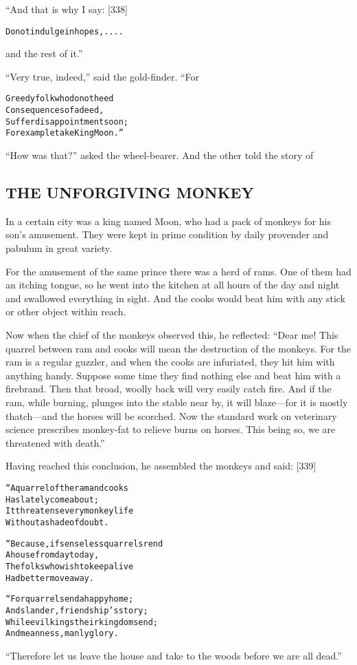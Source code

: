 \documentclass{article}
\renewenvironment{verbatim}{\begin{alltt}\normalfont\begin{centering}}{\end{centering}\end{alltt}}
\begin{document}
“And that is why I say: [338]

\begin{verbatim}
Do not indulge in hopes, ....
\end{verbatim}
and the rest of it.”

``Very true, indeed,'' said the gold-finder. “For

\begin{verbatim}
Greedy folk who do not heed
Consequences of a deed,
Suffer disappointment soon;
For example take King Moon.”
\end{verbatim}
``How was that?'' asked the wheel-bearer. And the other told the
story of

\subsection{THE UNFORGIVING MONKEY}

In a certain city was a king named Moon, who had a pack of monkeys
for his son's amusement. They were kept in prime condition by daily
provender and pabulum in great variety.

For the amusement of the same prince there was a herd of rams. One
of them had an itching tongue, so he went into the kitchen at all
hours of the day and night and swallowed everything in sight. And
the cooks would beat him with any stick or other object within
reach.

Now when the chief of the monkeys observed this, he reflected:
``Dear me! This quarrel between ram and cooks will mean the destruction of the monkeys. For the ram is a regular guzzler, and when the cooks are infuriated, they hit him with anything handy. Suppose some time they find nothing else and beat him with a firebrand. Then that broad, woolly back will very easily catch fire. And if the ram, while burning, plunges into the stable near by, it will blaze---for it is mostly thatch---and the horses will be scorched. Now the standard work on veterinary science prescribes monkey-fat to relieve burns on horses. This being so, we are threatened with death.''

Having reached this conclusion, he assembled the monkeys and said:
[339]

\begin{verbatim}
“A quarrel of the ram and cooks
    Has lately come about;
It threatens every monkey life
    Without a shade of doubt.

“Because, if senseless quarrels rend
    A house from day to day,
The folks who wish to keep alive
    Had better move away.

“For quarrels end a happy home;
    And slander, friendship's story;
While evil kings their kingdoms end;
    And meanness, manly glory.
\end{verbatim}
``Therefore let us leave the house and take to the woods before we are all dead.''
\end{document}
